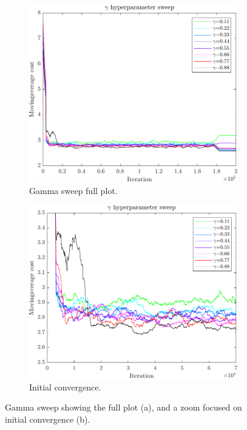 \begin{figure}
	\centering
	\begin{subfigure}{.5\textwidth}
		\centering
		\includegraphics[width=1\linewidth]{figures/GammaSweepTabRealH.pdf}
		\caption{Gamma sweep full plot.}
		\label{fig:GammaSweepTabularFull}
	\end{subfigure}%
	\begin{subfigure}{.5\textwidth}
		\centering
		\includegraphics[width=1\linewidth]{figures/GammaSweepTabRealHZoom.pdf}
		\caption{Initial convergence.}
		\label{fig:GammaSweepTabularZoom}
	\end{subfigure}
	\caption{Gamma sweep showing the full plot (a), and a zoom focused on initial convergence (b).}
	\label{fig:Gammasweep}
\end{figure}

